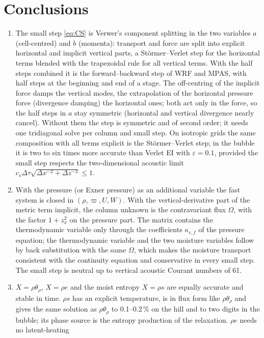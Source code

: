 \documentclass[11pt,a4paper]{article}
\newcommand{\dtau}{\Delta\tau}
\newcommand{\pv}{\varpi}      %
\begin{document}
\section{Conclusions}\label{sec:concl}
\begin{enumerate}
\item The small step \eqref{eq:CS} is Verwer's component splitting \cite{verwer} in the two variables $a$ (cell-centred)
and $b$ (momenta): transport and force are split into explicit horizontal and implicit vertical parts, a
Störmer--Verlet step for the horizontal terms blended with the trapezoidal rule for all vertical terms. With
the half steps combined it is the forward--backward step of WRF and MPAS, with half steps at the beginning
and end of a stage. The off-centring of the implicit force damps the vertical modes, the extrapolation of the
horizontal pressure force (divergence damping) the horizontal ones; both act only in the force, so the half
steps in $a$ stay symmetric (horizontal and vertical divergence nearly cancel). Without them the step is
symmetric and of second order; it needs one tridiagonal solve per column and small step. On isotropic grids the same composition with all terms explicit is the Störmer--Verlet
step; in the bubble it is two to six times more accurate than Verlet EI with $\varepsilon=0.1$, provided the small step
respects the two-dimensional acoustic limit $c_s\dtau\sqrt{\Delta x^{-2}+\Delta z^{-2}}\le1$.
\item With the pressure (or Exner pressure) as an additional variable the fast system is closed in
$(\rho,\pv,U,W)$. With the vertical-derivative part of the metric term implicit, the column unknown is
the contravariant flux $\Omega$, with the factor $1+z_x^2$ on the pressure part. The matrix contains the
thermodynamic variable only through the coefficients $\kappa_{c,f}$ of the pressure equation; the
thermodynamic variable and the two moisture variables follow by back substitution with the same
$\Omega$, which makes the moisture transport consistent with the continuity equation and conservative in
every small step. The small step is neutral up to vertical acoustic Courant numbers of 61.
\item $X=\rho\theta_\rho$, $X=\rho e$ and the moist entropy $X=\rho s$ are equally accurate and stable in time. $\rho s$ has an explicit
temperature, is in flux form like $\rho\theta_\rho$ and gives the same solution as $\rho\theta_\rho$ to 0.1--0.2\,\% on the hill and to
two digits in the bubble; its phase source is the entropy production of the relaxation. $\rho e$ needs no latent-heating

\end{enumerate}
\end{document}
